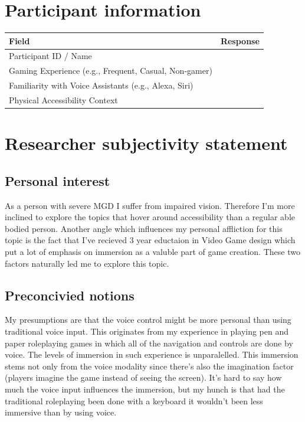 \section{Participant information}
\begin{table}[h]
\centering
\begin{tabular}{|p{5cm}|p{10cm}|}
\hline
\textbf{Field} & \textbf{Response} \\ \hline
Participant ID / Name & \\[1.5cm] \hline
Gaming Experience (e.g., Frequent, Casual, Non-gamer) & \\[1.5cm] \hline
Familiarity with Voice Assistants (e.g., Alexa, Siri) & \\[1.5cm] \hline
Physical Accessibility Context & \\[2cm] \hline
\end{tabular}
\end{table}


\section{Researcher subjectivity statement}

\subsection{Personal interest}

    As a person with severe MGD I suffer from impaired vision. Therefore I'm more inclined to explore the topics that hover around accessibility than a regular able bodied person.
Another angle which influences my personal affliction for this topic is the fact that I've recieved 3 year eductaion in Video Game design which put a lot of emphasis on immersion
as a valuble part of game creation. These two factors naturally led me to explore this topic.
\subsection{Preconcivied notions}
My presumptions are that the voice control might be more personal than using traditional voice input. This originates from my experience in playing pen and paper roleplaying 
games in which all of the navigation and controls are done by voice. The levels of immersion in such experience is unparalelled. This immersion stems not only from the voice 
modality since there's also the imagination factor (players imagine the game instead of seeing the screen). It's hard to say how much the voice input influences the immersion, 
but my hunch is that had the traditional roleplaying been done with a keyboard it wouldn't been less immersive than by using voice. 

